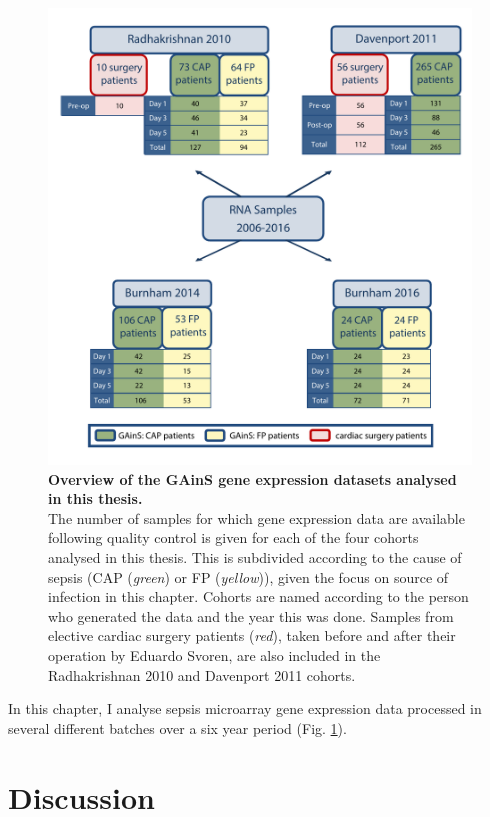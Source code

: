 \begin{figure}[htbp]
\centering
\includegraphics[width=\textwidth]{./Results1/CohortOverview}
\caption[Overview of GAinS gene expression cohorts]{\textbf{Overview of the GAinS gene expression datasets analysed in this thesis.} \\
The number of samples for which gene expression data are available following quality control is given for each of the four cohorts analysed in this thesis. This is subdivided according to the cause of sepsis (CAP (\emph{green}) or FP (\emph{yellow})), given the focus on source of infection in this chapter. Cohorts are named according to the person who generated the data and the year this was done. Samples from elective cardiac surgery patients (\emph{red}), taken before and after their operation by Eduardo Svoren, are also included in the Radhakrishnan 2010 and Davenport 2011 cohorts.}
\label{fig:CohortOverview}
\end{figure}

In this chapter, I analyse sepsis microarray gene expression data processed in several different batches over a six year period (Fig. \ref{fig:CohortOverview}). 

\section{Discussion}

